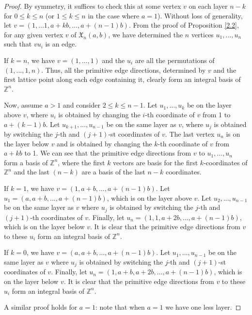 \documentclass[11pt]{amsart}
\theoremstyle{definition}
\newcommand{\0}{\emptyset}
\begin{document}
\begin{proof}
By symmetry, it suffices to check this at some vertex $v$ on each layer $n-k$ for $0\leq k\leq n$ (or $1 \leq  k\leq n$ in the case where $a=1$). 
Without loss of generality, let $v = (1,\dots 1, a+kb,\dots, a+(n-1)b)$.
From the proof of Proposition \ref{2.2}, for any given vertex $v$ of $\mathfrak{X}_{n}(a,b)$, we have determined the $n$ vertices $u_1,\dots, u_n$ such that $vu_i$ is an edge. 

If $k=n$, we have $v = (1,\dots, 1)$ and the $u_i$ are all the permutations of $(1,\dots, 1, n)$. 
Thus, all the primitive edge directions, determined by $v$ and the first lattice point along each edge containing it, clearly form an integral basis of $\mathbb{Z}^n$.

Now, assume $a>1$ and consider $2\leq k \leq n-1$. 
Let $u_1, \dots, u_k$ be on the layer above $v$, where $u_i$ is obtained by changing the $i$-th coordinate of $v$ from 1 to $a+(k-1)b$. 
Let $u_{k+1}, \dots, u_{n-1}$ be on the same layer as $v$, where $u_j$ is obtained by switching the $j$-th and $(j+1)$-st coordinates of $v$. 
The last vertex $u_n$ is on the layer below $v$ and is obtained by changing the $k$-th coordinate of $v$ from $a+kb$ to 1.
We can see that the primitive edge directions from $v$ to $u_1,\dots, u_n$ form a basis of $\mathbb{Z}^n$, where the first $k$ vectors are basis for the first $k$-coordinates of $\mathbb{Z}^n$ and the last $(n-k)$ are a basis of the last $n-k$ coordinates.

If $k =1$, we have $v = (1, a+b, \dots, a+(n-1)b)$. 
Let $u_1 = (a, a+b,\dots, a+(n-1)b)$, which is on the layer above $v$.
Let $u_2,\dots, u_{n-1}$ be on the same layer as $v$ where $u_j$ is obtained by switching the $j$-th and $(j+1)$-th coordinates of $v$. 
Finally, let $u_n = (1,1, a+2b,\dots, a+(n-1)b)$, which is on the layer below $v$. 
It is clear that the primitive edge directions from $v$ to these $u_i$ form an integral basis of $\mathbb{Z}^n$.

If $k = 0$, we have $v  = (a, a+b,\dots, a+(n-1)b)$.
Let $u_1,\dots, u_{n-1}$ be on the same layer as $v$ where $u_j$  is obtained by switching the $j$-th and $(j+1)$-st coordinates of $v$.
Finally, let $u_n = (1,a+b, a+2b,\dots, a+(n-1)b)$, which is on the layer below $v$.
It is clear that the primitive edge directions from $v$ to these $u_i$ form an integral basis of $\mathbb{Z}^n$.

A similar proof holds for $a=1$: note that when $a=1$ we have one less layer.
\end{proof}
\end{document}
